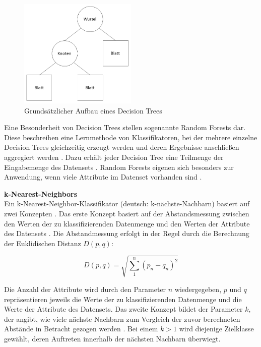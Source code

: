 \begin{figure}[t]
    \centering
    \includegraphics[width=0.5\textwidth]{images/DT}
    \caption{Grundsätzlicher Aufbau eines Decision Trees\label{fig:dt}}
\end{figure}

Eine Besonderheit von Decision Trees stellen sogenannte Random Forests dar. Diese beschreiben eine Lernmethode von Klassifikatoren, bei der mehrere einzelne Decision Trees gleichzeitig erzeugt werden und deren Ergebnisse anschließen aggregiert werden \cite{Alam2013}. Dazu erhält jeder Decision Tree eine Teilmenge der Eingabemenge des Datensets \cite{Alam2013}. Random Forests eigenen sich besonders zur Anwendung, wenn viele Attribute im Datenset vorhanden sind \cite{Alam2013}.

\textbf{k-Nearest-Neighbors\medskip}\\
Ein k-Nearest-Neighbor-Klassifikator (deutsch: k-nächste-Nachbarn) basiert auf zwei Konzepten \cite{Zhang2016}. Das erste Konzept basiert auf der Abstandsmessung zwischen den Werten der zu klassifizierenden Datenmenge und den Werten der Attribute des Datensets \cite{Zhang2016}. Die Abstandmessung erfolgt in der Regel durch die Berechnung der Euklidischen Distanz $D(p,q)$:

\[D(p,q)=\sqrt{\sum_1^n(p_{n}-q_{n})^{2}}\] 

Die Anzahl der Attribute wird durch den Parameter $n$ wiedergegeben, $p$ und $q$ repräsentieren jeweils die Werte der zu klassifizierenden Datenmenge und die Werte der Attribute des Datensets. Das zweite Konzept bildet der Parameter $k$, der angibt, wie viele nächste Nachbarn zum Vergleich der zuvor berechneten Abstände in Betracht gezogen werden \cite{Zhang2016}. Bei einem $k > 1$ wird diejenige Zielklasse gewählt, deren Auftreten innerhalb der nächsten Nachbarn überwiegt.

